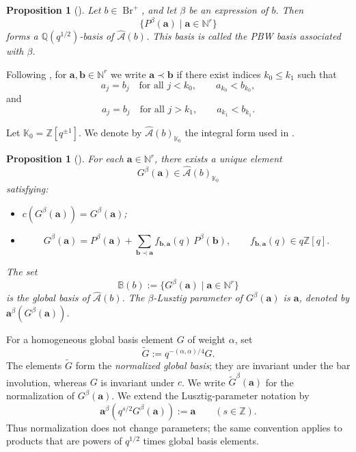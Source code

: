 \documentclass[12pt, reqno]{amsart}
\theoremstyle{plain}
\newtheorem{proposition}[theorem]{Proposition}
\theoremstyle{definition}
\numberwithin{equation}{section}
\newcommand{\Br}{{\operatorname{Br}}}
\begin{document}
\begin{proposition}[{\cite{oh2025pbw,kashiwara2024braid}}]
Let \(b\in\Br^+\), and let \(\beta\) be an expression of \(b\). Then
\[
\{P^\beta(\mathbf a)\mid \mathbf a\in\mathbb N^r\}
\]
forms a \(\mathbb Q(q^{1/2})\)-basis of \(\widehat{\mathcal A}(b)\). This basis
is called the \emph{PBW basis} associated with \(\beta\).
\end{proposition}

Following \cite[Definition~4.14]{kashiwara2024braid}, for
$\mathbf a,\mathbf b\in\mathbb N^r$ we write $\mathbf a\prec\mathbf b$ if
there exist indices \(k_0\leq k_1\) such that
\[
a_j=b_j \quad \text{for all } j<k_0,
\qquad
a_{k_0}<b_{k_0},
\]
and
\[
a_j=b_j \quad \text{for all } j>k_1,
\qquad
a_{k_1}<b_{k_1}.
\]

Let \(\mathbb K_0=\mathbb Z[q^{\pm1}]\). We denote by
\(\widehat{\mathcal A}(b)_{\mathbb K_0}\) the integral form used in
\cite{kashiwara2024braid}.

\begin{proposition}[{\cite{kashiwara2024braid}}]
For each \(\mathbf a\in\mathbb N^r\), there exists a unique element
\[
G^\beta(\mathbf a)\in \widehat{\mathcal A}(b)_{\mathbb K_0}
\]
satisfying:
\begin{itemize}
\item \(c(G^\beta(\mathbf a))=G^\beta(\mathbf a)\);
\item
\begin{equation}\label{eq:GPbfa}
G^\beta(\mathbf a)
=
P^\beta(\mathbf a)
+
\sum_{\mathbf b\prec\mathbf a}
f_{\mathbf b,\mathbf a}(q)\,P^\beta(\mathbf b),
\qquad
f_{\mathbf b,\mathbf a}(q)\in q\mathbb Z[q].
\end{equation}
\end{itemize}
The set
\[
\mathbb B(b):=\{G^\beta(\mathbf a)\mid \mathbf a\in\mathbb N^r\}
\]
is the \emph{global basis} of $\widehat{\mathcal A}(b)$.
The \emph{$\beta$-Lusztig parameter} of $G^\beta(\mathbf a)$ is
$\mathbf a$, denoted by $\mathbf a^\beta(G^\beta(\mathbf a))$.
\end{proposition}

For a homogeneous global basis element $G$ of weight $\alpha$, set
\[
    \widetilde G:=q^{-(\alpha,\alpha)/4}G.
\]
The elements $\widetilde G$ form the \emph{normalized global basis}; they
are invariant under the bar involution, whereas $G$ is invariant under $c$.
We write $\widetilde G^\beta(\mathbf a)$ for the normalization of
$G^\beta(\mathbf a)$. We extend the Lusztig-parameter notation by
\[
    \mathbf a^\beta(q^{s/2}G^\beta(\mathbf a)):=\mathbf a
    \qquad(s\in\mathbb Z).
\]
Thus normalization does not change parameters; the same convention applies
to products that are powers of $q^{1/2}$ times global basis elements.
\end{document}
